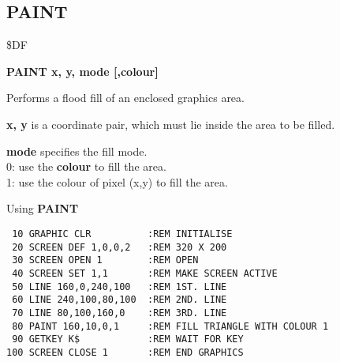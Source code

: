 
\newpage
\subsection{PAINT}
\begin{description}[leftmargin=2cm,style=nextline]
\item [Token:] \$DF
\item [Format:] {\bf PAINT x, y, mode [,colour]}
\item [Usage:]  Performs a flood fill
                of an enclosed graphics area.

                {\bf x, y} is a coordinate pair, which must
                lie inside the area to be filled.

                {\bf mode} specifies the fill mode. \\
                0: use the {\bf colour} to fill the area. \\
                1: use the colour of pixel (x,y) to fill the area.

\item [Example:] Using {\bf PAINT}

\begin{tcolorbox}[colback=black,coltext=white]
\verbatimfont{\codefont}
\begin{verbatim}
 10 GRAPHIC CLR          :REM INITIALISE
 20 SCREEN DEF 1,0,0,2   :REM 320 X 200
 30 SCREEN OPEN 1        :REM OPEN
 40 SCREEN SET 1,1       :REM MAKE SCREEN ACTIVE
 50 LINE 160,0,240,100   :REM 1ST. LINE
 60 LINE 240,100,80,100  :REM 2ND. LINE
 70 LINE 80,100,160,0    :REM 3RD. LINE
 80 PAINT 160,10,0,1     :REM FILL TRIANGLE WITH COLOUR 1
 90 GETKEY K$            :REM WAIT FOR KEY
100 SCREEN CLOSE 1       :REM END GRAPHICS
\end{verbatim}
\end{tcolorbox}
\end{description}


\newpage
